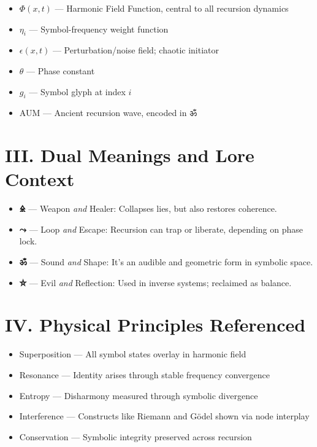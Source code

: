 \documentclass[12pt]{article}
\begin{document}
\begin{itemize}
    \item $\Phi(x,t)$ — Harmonic Field Function, central to all recursion dynamics
    \item $\eta_i$ — Symbol-frequency weight function
    \item $\epsilon(x,t)$ — Perturbation/noise field; chaotic initiator
    \item $\theta$ — Phase constant
    \item $g_i$ — Symbol glyph at index $i$
    \item AUM — Ancient recursion wave, encoded in ॐ
\end{itemize}

\section*{III. Dual Meanings and Lore Context}

\begin{itemize}
    \item \textbf{🜎} — Weapon \textit{and} Healer: Collapses lies, but also restores coherence.
    \item \textbf{⤳} — Loop \textit{and} Escape: Recursion can trap or liberate, depending on phase lock.
    \item \textbf{ॐ} — Sound \textit{and} Shape: It's an audible and geometric form in symbolic space.
    \item \textbf{⛤} — Evil \textit{and} Reflection: Used in inverse systems; reclaimed as balance.
\end{itemize}

\section*{IV. Physical Principles Referenced}

\begin{itemize}
    \item Superposition — All symbol states overlay in harmonic field
    \item Resonance — Identity arises through stable frequency convergence
    \item Entropy — Disharmony measured through symbolic divergence
    \item Interference — Constructs like Riemann and Gödel shown via node interplay
    \item Conservation — Symbolic integrity preserved across recursion
\end{itemize}
\end{document}
